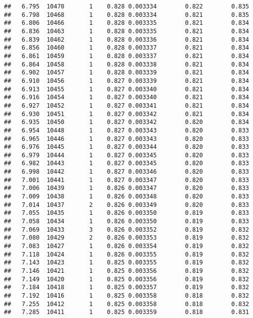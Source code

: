\documentclass[
]{book}
\begin{document}
\begin{verbatim}
##   6.795  10470       1    0.828 0.003334        0.822        0.835
##   6.798  10468       1    0.828 0.003334        0.821        0.835
##   6.806  10466       1    0.828 0.003335        0.821        0.834
##   6.836  10463       1    0.828 0.003335        0.821        0.834
##   6.839  10462       1    0.828 0.003336        0.821        0.834
##   6.856  10460       1    0.828 0.003337        0.821        0.834
##   6.861  10459       1    0.828 0.003337        0.821        0.834
##   6.864  10458       1    0.828 0.003338        0.821        0.834
##   6.902  10457       1    0.828 0.003339        0.821        0.834
##   6.910  10456       1    0.827 0.003339        0.821        0.834
##   6.913  10455       1    0.827 0.003340        0.821        0.834
##   6.916  10454       1    0.827 0.003340        0.821        0.834
##   6.927  10452       1    0.827 0.003341        0.821        0.834
##   6.930  10451       1    0.827 0.003342        0.821        0.834
##   6.935  10450       1    0.827 0.003342        0.820        0.834
##   6.954  10448       1    0.827 0.003343        0.820        0.833
##   6.965  10446       1    0.827 0.003343        0.820        0.833
##   6.976  10445       1    0.827 0.003344        0.820        0.833
##   6.979  10444       1    0.827 0.003345        0.820        0.833
##   6.982  10443       1    0.827 0.003345        0.820        0.833
##   6.998  10442       1    0.827 0.003346        0.820        0.833
##   7.001  10441       1    0.827 0.003347        0.820        0.833
##   7.006  10439       1    0.826 0.003347        0.820        0.833
##   7.009  10438       1    0.826 0.003348        0.820        0.833
##   7.014  10437       2    0.826 0.003349        0.820        0.833
##   7.055  10435       1    0.826 0.003350        0.819        0.833
##   7.058  10434       1    0.826 0.003350        0.819        0.833
##   7.069  10433       3    0.826 0.003352        0.819        0.832
##   7.080  10429       2    0.826 0.003353        0.819        0.832
##   7.083  10427       1    0.826 0.003354        0.819        0.832
##   7.118  10424       1    0.826 0.003355        0.819        0.832
##   7.143  10423       1    0.825 0.003355        0.819        0.832
##   7.146  10421       1    0.825 0.003356        0.819        0.832
##   7.149  10420       1    0.825 0.003356        0.819        0.832
##   7.184  10418       1    0.825 0.003357        0.819        0.832
##   7.192  10416       1    0.825 0.003358        0.818        0.832
##   7.255  10412       1    0.825 0.003358        0.818        0.832
##   7.285  10411       1    0.825 0.003359        0.818        0.831

\end{verbatim}
\end{document}
